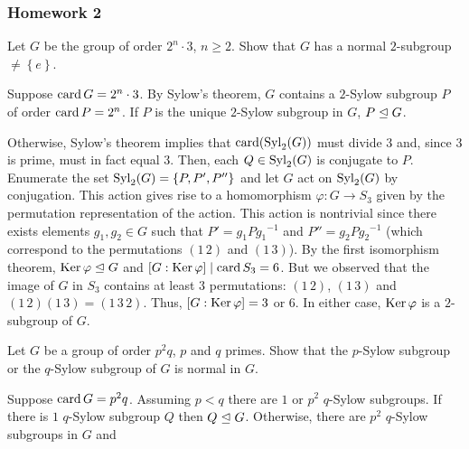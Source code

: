 \subsubsection{Homework 2}
\setcounter{exercise}{0}
\setcounter{equation}{0}

\begin{problem}
  Let \(G\) be the group of order \(2^n\cdot 3\), \(n\geq 2\). Show that
  \(G\) has a normal \(2\)-subgroup \(\neq\left\{e\right\}\).
\end{problem}
\begin{solution}
  Suppose \(\operatorname{card} G=2^n\cdot 3\). By Sylow's theorem, \(G\) contains a
  \(2\)-Sylow subgroup \(P\) of order \(\operatorname{card} P=2^n\). If \(P\) is the
  unique \(2\)-Sylow subgroup in \(G\), \(P\trianglelefteq G\).

  Otherwise, Sylow's theorem implies that \(\operatorname{card}({\operatorname{Syl}_2(G)})\) must
  divide \(3\) and, since \(3\) is prime, must in fact equal \(3\). Then,
  each \(Q\in\operatorname{Syl}_2(G)\) is conjugate to \(P\). Enumerate the set
  \(\operatorname{Syl}_2(G)=\left\{P,P',P''\right\}\) and let \(G\) act on \(\operatorname{Syl}_2(G)\)
  by conjugation. This action gives rise to a homomorphism
  \(\varphi\colon G\to S_3\) given by the permutation representation of the
  action. This action is nontrivial since there exists elements
  \(g_1,g_2\in G\) such that \(P'=g_1P{g_1}^{-1}\) and
  \(P''=g_2P{g_2}^{-1}\) (which correspond to the permutations \((1\,2)\)
  and \((1\,3)\)). By the first isomorphism theorem,
  \(\operatorname{Ker}\varphi\trianglelefteq G\) and \([G:{\operatorname{Ker}\varphi}]\mid \operatorname{card} S_3=6\). But
  we observed that the image of \(G\) in \(S_3\) contains at least \(3\)
  permutations: \((1\,2)\), \((1\,3)\) and
  \((1\,2)(1\,3)=(1\,3\,2)\). Thus, \([G:{\operatorname{Ker}\varphi}]=3\) or \(6\). In
  either case, \(\operatorname{Ker}\varphi\) is a \(2\)-subgroup of \(G\).
\end{solution}

\begin{problem}
  Let \(G\) be a group of order \(p^2q\), \(p\) and \(q\) primes. Show that
  the \(p\)-Sylow subgroup or the \(q\)-Sylow subgroup of \(G\) is normal
  in \(G\).
\end{problem}
\begin{solution}
  Suppose \(\operatorname{card} G=p^2q\). Assuming \(p<q\) there are \(1\) or \(p^2\)
  \(q\)-Sylow subgroups. If there is \(1\) \(q\)-Sylow subgroup \(Q\) then
  \(Q\trianglelefteq G\). Otherwise, there are \(p^2\) \(q\)-Sylow subgroups in
  \(G\) and
\end{solution}

